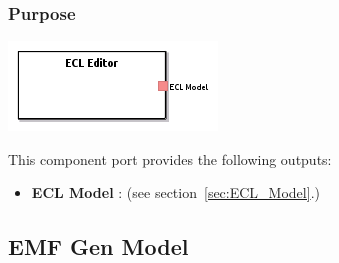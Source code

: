 \documentclass{gemoc} %
\begin{document}

\subsubsection{Purpose}


\begin{center}
\includegraphics*[trim=0.0cm 0.0cm 0cm 0.0cm, clip=true]{../images/generated/Generated_ECL_Editor.png}
\end{center}


This component port provides the following outputs:
\begin{itemize}
  \item \textbf{ECL Model} :
(see section~\ref{sec:ECL_Model}.)
\end{itemize}


\subsection{EMF Gen Model}
\label{sec:EMF_Gen_Model}

\end{document}
